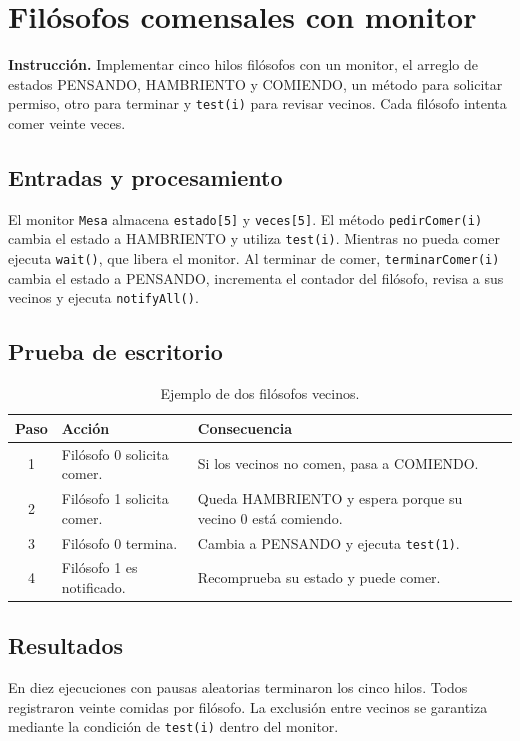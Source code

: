 \documentclass[12pt]{report}
\begin{document}
\chapter{Filósofos comensales con monitor}
\textbf{Instrucción.} Implementar cinco hilos filósofos con un monitor, el arreglo de estados PENSANDO, HAMBRIENTO y COMIENDO, un método para solicitar permiso, otro para terminar y \texttt{test(i)} para revisar vecinos. Cada filósofo intenta comer veinte veces.

\section{Entradas y procesamiento}
El monitor \texttt{Mesa} almacena \texttt{estado[5]} y \texttt{veces[5]}. El método \texttt{pedirComer(i)} cambia el estado a HAMBRIENTO y utiliza \texttt{test(i)}. Mientras no pueda comer ejecuta \texttt{wait()}, que libera el monitor. Al terminar de comer, \texttt{terminarComer(i)} cambia el estado a PENSANDO, incrementa el contador del filósofo, revisa a sus vecinos y ejecuta \texttt{notifyAll()}.

\section{Prueba de escritorio}
\begin{table}[H]\centering\caption{Ejemplo de dos filósofos vecinos.}
\begin{tabularx}{\textwidth}{c X X}\toprule
Paso & Acción & Consecuencia\\\midrule
1 & Filósofo 0 solicita comer. & Si los vecinos no comen, pasa a COMIENDO.\\
2 & Filósofo 1 solicita comer. & Queda HAMBRIENTO y espera porque su vecino 0 está comiendo.\\
3 & Filósofo 0 termina. & Cambia a PENSANDO y ejecuta \texttt{test(1)}.\\
4 & Filósofo 1 es notificado. & Recomprueba su estado y puede comer.\\\bottomrule
\end{tabularx}\end{table}

\section{Resultados}
En diez ejecuciones con pausas aleatorias terminaron los cinco hilos. Todos registraron veinte comidas por filósofo. La exclusión entre vecinos se garantiza mediante la condición de \texttt{test(i)} dentro del monitor.
\end{document}
